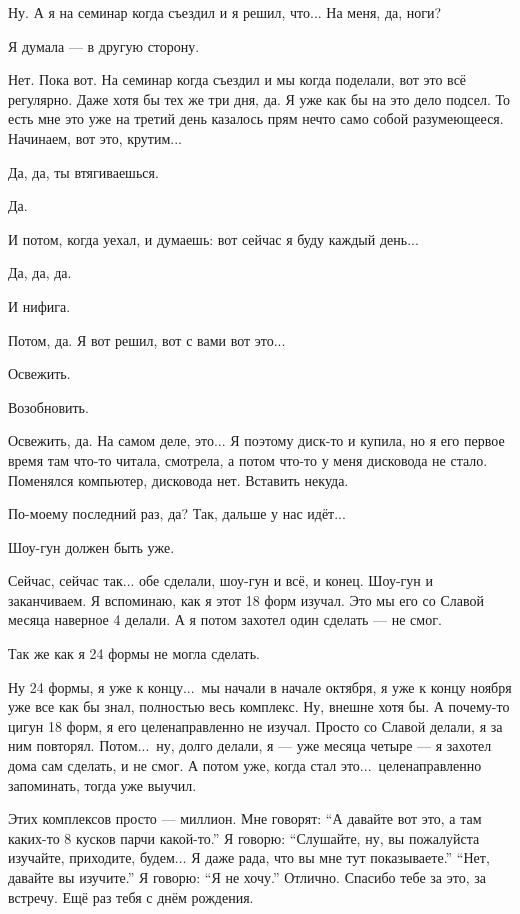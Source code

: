 \I
Ну. А я на семинар когда съездил и я решил, что... На меня, да, ноги?

\M
Я думала --- в другую сторону.

\I
Нет. Пока вот. На семинар когда съездил и мы когда поделали, вот это всё
регулярно. Даже хотя бы тех же три дня, да.
Я уже как бы на это дело подсел. То есть мне это уже на третий день казалось
прям нечто само собой разумеющееся. Начинаем, вот это, крутим...

\M
Да, да, ты втягиваешься.

\I
Да.

\M
И потом, когда уехал, и думаешь: вот сейчас я буду каждый день...

\I
Да, да, да.

\M
И нифига.

\I
Потом, да. Я вот решил, вот с вами вот это...

\M
Освежить.

\I
Возобновить.

\M
Освежить, да.
На самом деле, это... Я поэтому диск-то и
купила, но я его первое
время там что-то читала, смотрела, а потом что-то у меня дисковода не стало.
Поменялся компьютер, дисковода нет.
Вставить некуда.

\I
По-моему последний раз, да?
Так, дальше у нас идёт...

\M
Шоу-гун должен быть уже.

\I
Сейчас, сейчас так...
обе сделали, шоу-гун и всё, и конец.
Шоу-гун и заканчиваем.
Я вспоминаю, как я этот 18 форм изучал.
Это мы его со Славой месяца наверное 4 делали.
А я потом захотел один сделать ---
не смог.

\M
Так же как я 24 формы не
могла сделать.

\I
Ну 24 формы, я уже к концу...\ мы начали в начале октября, я уже к концу ноября
уже все как бы знал, полностью весь комплекс. Ну, внешне хотя бы.
А почему-то цигун 18 форм, я его целенаправленно
не изучал. Просто со Славой делали, я за ним
повторял. Потом...\ ну, долго делали, я --- уже месяца четыре --- я захотел дома сам сделать,
и не смог. А потом уже, когда стал это...\ целенаправленно
запоминать, тогда уже выучил.

\M
Этих комплексов просто --- миллион. Мне говорят:
``А давайте вот это, а там каких-то 8 кусков парчи какой-то.''
Я говорю: ``Слушайте, ну, вы пожалуйста изучайте, приходите, будем...
Я даже рада, что вы мне тут показываете.''
``Нет, давайте вы изучите.'' Я говорю: ``Я не хочу.''
Отлично.
Спасибо тебе за это, за встречу.
Ещё раз тебя с днём рождения.


